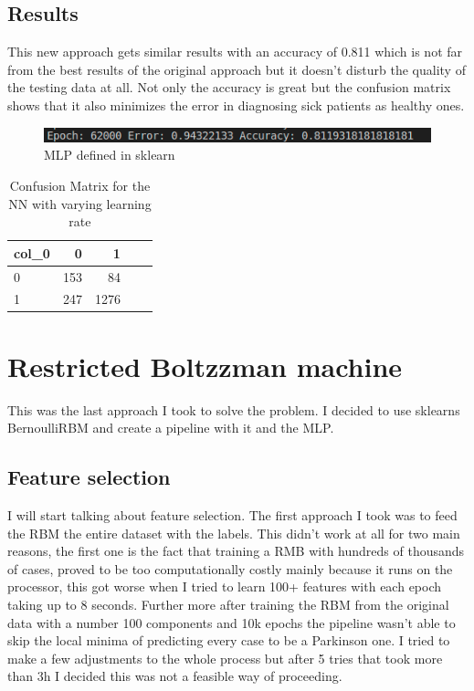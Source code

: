 \documentclass{article} %
\begin{document}
\subsection*{Results}

This new approach gets similar results with an accuracy of 0.811 which is not far from the best results of the original approach but it doesn't disturb the quality of the testing data at all. Not only the accuracy is great but the confusion matrix shows that it also minimizes the error in diagnosing sick patients as healthy ones.
\bigskip
\bigskip

\begin{figure}[h!]
  \includegraphics[scale = 1]{epoch292.png}
  \centering
  \caption{MLP defined in sklearn}\hspace*{\fill}
  \label{fig:a}
\end{figure}

\bigskip
\bigskip
\bigskip
\bigskip
\bigskip
\begin{table}[h!]
\centering
\begin{tabular}{lrrrr}
\toprule \hline
col\_0 &   0 &   1 & \\\hline
0     &  153 &   84 & \\\hline
1     &   247 &  1276  \\\hline
\bottomrule \hline
\end{tabular}
\caption{Confusion Matrix for the NN with varying learning rate}
 \label{tab:CG}
\end{table}

\bigskip
\bigskip
\bigskip
\bigskip
\bigskip
\bigskip
\bigskip
\bigskip
\bigskip
\bigskip
\section{Restricted Boltzzman machine}

This was the last approach I took to solve the problem. I decided to use sklearns BernoulliRBM and create a pipeline with it and the MLP.

\bigskip
\subsection{Feature selection}

I will start talking about feature selection. The first approach I took was to feed the RBM the entire dataset with the labels. This didn't work at all for two main reasons, the first one is the fact that training a RMB with hundreds of thousands of cases, proved to be too computationally costly mainly because it runs on the processor, this got worse when I tried to learn 100+ features with each epoch taking up to 8 seconds. Further more after training the RBM from the original data with a number 100 components and 10k epochs the pipeline wasn't able to skip the local minima of predicting every case to be a Parkinson one. I tried to make a few adjustments to the whole process but after 5 tries that took more than 3h I decided this was not a feasible way of proceeding.
\end{document}
